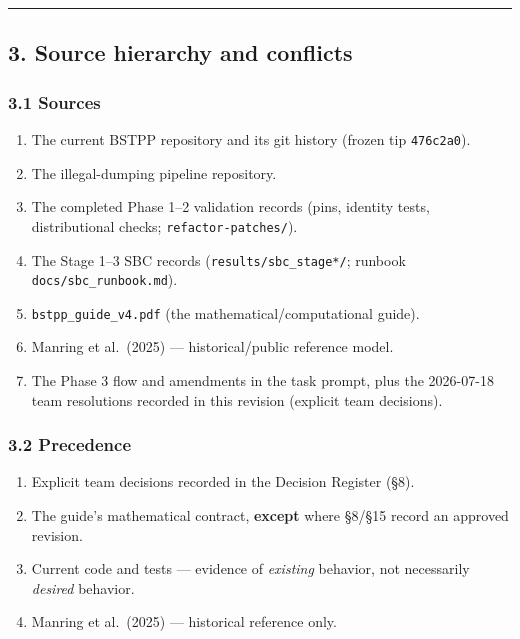 \documentclass[
  10pt,
]{article}
\providecommand{\tightlist}{%
  \setlength{\itemsep}{0pt}\setlength{\parskip}{0pt}}
\begin{document}
\begin{center}\rule{0.5\linewidth}{0.5pt}\end{center}

\hypertarget{source-hierarchy-and-conflicts}{%
\subsection{3. Source hierarchy and conflicts}\label{source-hierarchy-and-conflicts}}

\hypertarget{sources}{%
\subsubsection{3.1 Sources}\label{sources}}

\begin{enumerate}
\def\labelenumi{\arabic{enumi}.}
\tightlist
\item
  The current BSTPP repository and its git history (frozen tip \texttt{476c2a0}).
\item
  The illegal-dumping pipeline repository.
\item
  The completed Phase 1--2 validation records (pins, identity tests, distributional checks; \texttt{refactor-patches/}).
\item
  The Stage 1--3 SBC records (\texttt{results/sbc\_stage*/}; runbook \texttt{docs/sbc\_runbook.md}).
\item
  \texttt{bstpp\_guide\_v4.pdf} (the mathematical/computational guide).
\item
  Manring et al.~(2025) --- historical/public reference model.
\item
  The Phase 3 flow and amendments in the task prompt, plus the 2026-07-18 team resolutions recorded in this revision (explicit team decisions).
\end{enumerate}

\hypertarget{precedence}{%
\subsubsection{3.2 Precedence}\label{precedence}}

\begin{enumerate}
\def\labelenumi{\arabic{enumi}.}
\tightlist
\item
  Explicit team decisions recorded in the Decision Register (§8).
\item
  The guide's mathematical contract, \textbf{except} where §8/§15 record an approved revision.
\item
  Current code and tests --- evidence of \emph{existing} behavior, not necessarily \emph{desired} behavior.
\item
  Manring et al.~(2025) --- historical reference only.
\end{enumerate}
\end{document}
